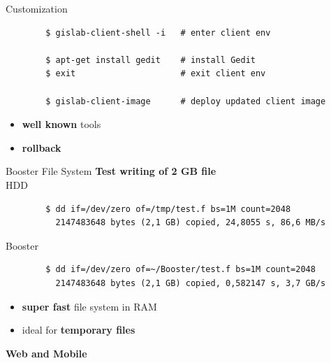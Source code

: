 \documentclass[12pt]{beamer}
\begin{document}
\begin{frame}[fragile]{Customization}
	\lstset{language=sh}
	\begin{lstlisting}
		$ gislab-client-shell -i   # enter client env

		$ apt-get install gedit    # install Gedit
		$ exit                     # exit client env

		$ gislab-client-image      # deploy updated client image
	\end{lstlisting}

	\begin{itemize}
		\item \textbf{well known} tools
		\item \textbf{rollback}
	\end{itemize}
\end{frame}

\begin{frame}[fragile]{Booster File System}
	\textbf{Test writing of 2 GB file}
	\\
	HDD
	\lstset{language=sh}
	\begin{lstlisting}
		$ dd if=/dev/zero of=/tmp/test.f bs=1M count=2048
		  2147483648 bytes (2,1 GB) copied, 24,8055 s, 86,6 MB/s
	\end{lstlisting}

	Booster
	\lstset{language=sh}
	\begin{lstlisting}
		$ dd if=/dev/zero of=~/Booster/test.f bs=1M count=2048
		  2147483648 bytes (2,1 GB) copied, 0,582147 s, 3,7 GB/s
	\end{lstlisting}

	\begin{itemize}
		\item \textbf{super fast} file system in RAM
		\item ideal for \textbf{temporary files}
	\end{itemize}
\end{frame}

\begin{frame}
	\begin{center}
		\LARGE\textbf{Web and Mobile}
	\end{center}
\end{frame}
\end{document}
